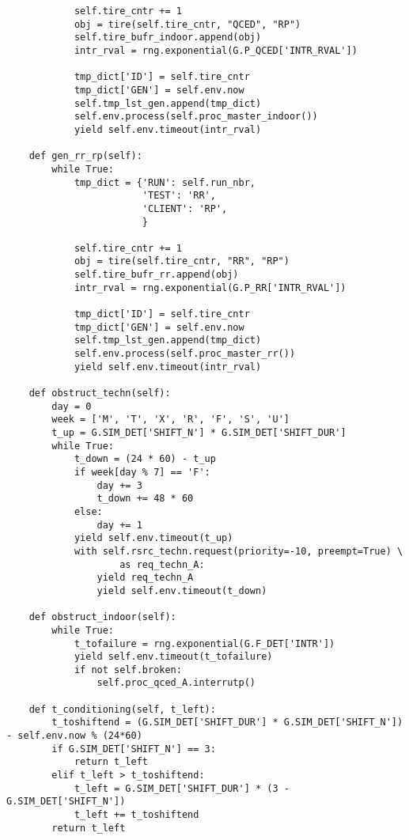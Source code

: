 \begin{verbatim}
            self.tire_cntr += 1
            obj = tire(self.tire_cntr, "QCED", "RP")
            self.tire_bufr_indoor.append(obj)
            intr_rval = rng.exponential(G.P_QCED['INTR_RVAL'])

            tmp_dict['ID'] = self.tire_cntr
            tmp_dict['GEN'] = self.env.now
            self.tmp_lst_gen.append(tmp_dict)
            self.env.process(self.proc_master_indoor())
            yield self.env.timeout(intr_rval)

    def gen_rr_rp(self):
        while True:
            tmp_dict = {'RUN': self.run_nbr,
                        'TEST': 'RR',
                        'CLIENT': 'RP',
                        }

            self.tire_cntr += 1
            obj = tire(self.tire_cntr, "RR", "RP")
            self.tire_bufr_rr.append(obj)
            intr_rval = rng.exponential(G.P_RR['INTR_RVAL'])

            tmp_dict['ID'] = self.tire_cntr
            tmp_dict['GEN'] = self.env.now
            self.tmp_lst_gen.append(tmp_dict)
            self.env.process(self.proc_master_rr())
            yield self.env.timeout(intr_rval)

    def obstruct_techn(self):
        day = 0
        week = ['M', 'T', 'X', 'R', 'F', 'S', 'U']
        t_up = G.SIM_DET['SHIFT_N'] * G.SIM_DET['SHIFT_DUR']
        while True:
            t_down = (24 * 60) - t_up
            if week[day % 7] == 'F':
                day += 3
                t_down += 48 * 60
            else:
                day += 1
            yield self.env.timeout(t_up)
            with self.rsrc_techn.request(priority=-10, preempt=True) \
                    as req_techn_A:
                yield req_techn_A
                yield self.env.timeout(t_down)

    def obstruct_indoor(self):
        while True:
            t_tofailure = rng.exponential(G.F_DET['INTR'])
            yield self.env.timeout(t_tofailure)
            if not self.broken:
                self.proc_qced_A.interrutp()

    def t_conditioning(self, t_left):
        t_toshiftend = (G.SIM_DET['SHIFT_DUR'] * G.SIM_DET['SHIFT_N']) - self.env.now % (24*60)
        if G.SIM_DET['SHIFT_N'] == 3:
            return t_left
        elif t_left > t_toshiftend:
            t_left = G.SIM_DET['SHIFT_DUR'] * (3 - G.SIM_DET['SHIFT_N'])
            t_left += t_toshiftend
        return t_left


\end{verbatim}
